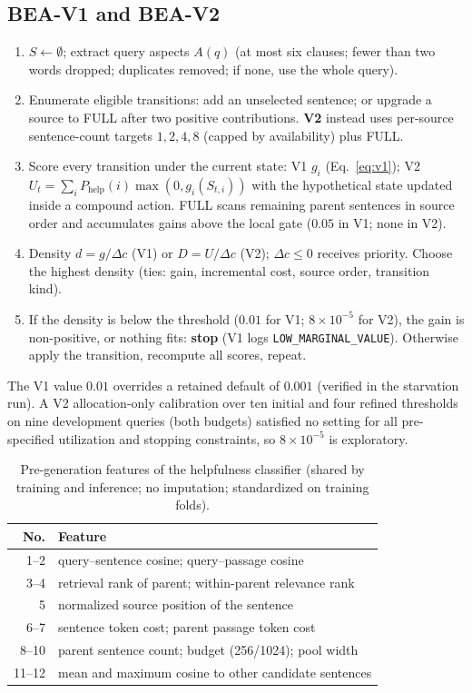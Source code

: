 \documentclass[10pt,twocolumn,letterpaper]{article}
\newcommand{\Phelp}{P_{\mathrm{help}}}
\begin{document}
\subsection{BEA-V1 and BEA-V2}
\begin{apbox}[title={Algorithm A2: BEA-V1 / BEA-V2 incremental allocation}]
\begin{enumerate}
\item $S{\leftarrow}\emptyset$; extract query aspects $A(q)$ (at most six clauses; fewer than two words dropped; duplicates removed; if none, use the whole query).
\item Enumerate eligible transitions: add an unselected sentence; or upgrade a source to FULL after two positive contributions. \textbf{V2} instead uses per-source sentence-count targets $1,2,4,8$ (capped by availability) plus FULL.
\item Score every transition under the current state: V1 $g_i$ (Eq.~\ref{eq:v1}); V2 $U_t=\sum_i\Phelp(i)\max(0,g_i(S_{t,i}))$ with the hypothetical state updated inside a compound action. FULL scans remaining parent sentences in source order and accumulates gains above the local gate ($0.05$ in V1; none in V2).
\item Density $d{=}g/\Delta c$ (V1) or $D{=}U/\Delta c$ (V2); $\Delta c{\le}0$ receives priority. Choose the highest density (ties: gain, incremental cost, source order, transition kind).
\item If the density is below the threshold ($0.01$ for V1; $8{\times}10^{-5}$ for V2), the gain is non-positive, or nothing fits: \textbf{stop} (V1 logs \texttt{LOW\_MARGINAL\_VALUE}). Otherwise apply the transition, recompute all scores, repeat.
\end{enumerate}
The V1 value $0.01$ overrides a retained default of $0.001$ (verified in the starvation run). A V2 allocation-only calibration over ten initial and four refined thresholds on nine development queries (both budgets) satisfied no setting for all pre-specified utilization and stopping constraints, so $8{\times}10^{-5}$ is exploratory.
\end{apbox}

\begin{table}[H]\centering\small\setlength{\tabcolsep}{5pt}
\caption{Pre-generation features of the helpfulness classifier (shared by training and inference; no imputation; standardized on training folds).}\label{tab:feat}
\begin{tabular}{rl}\toprule
No. & Feature\\\midrule
1--2 & query--sentence cosine; query--passage cosine\\
3--4 & retrieval rank of parent; within-parent relevance rank\\
5 & normalized source position of the sentence\\
6--7 & sentence token cost; parent passage token cost\\
8--10 & parent sentence count; budget (256/1024); pool width\\
11--12 & mean and maximum cosine to other candidate sentences\\\bottomrule
\end{tabular}\end{table}
\end{document}
